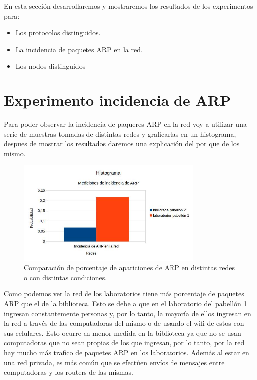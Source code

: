 En esta sección desarrollaremos y mostraremos los resultados de los experimentos para:

\begin{itemize}
\item Los protocolos distinguidos.
\item La incidencia de paquetes ARP en la red.
\item Los nodos distinguidos.
\end{itemize}

\section{Experimento incidencia de ARP}

Para poder observar la incidencia de paqueres ARP en la red voy a utilizar una serie de muestras tomadas de distintas redes y graficarlas en un histograma, despues de mostrar
los resultados daremos una explicación del por que de los mismo.

\begin{figure}[ht!]
\centering
\includegraphics[width=90mm]{imagenes/IncidenciaARP.jpg}
\caption{Comparación de porcentaje de apariciones de ARP en distintas redes o con distintas condiciones.\label{overflow}}
\end{figure}

Como podemos ver la red de los laboratorios tiene más porcentaje de paquetes ARP que el de la biblioteca. Esto se debe a que en el laboratorio del pabellón 1 ingresan 
constantemente personas y, por lo tanto, la mayoría de ellos ingresan en la red a través de las computadoras del mismo o de usando el wifi de estos con sus celulares. Esto 
ocurre en menor medida en la biblioteca ya que no se usan computadoras que no sean propias de los que ingresan, por lo tanto, por la red hay mucho más trafico de paquetes 
ARP en los laboratorios. Además al estar en una red privada, es más común que se efectúen envíos de mensajes entre computadoras y los routers de las mismas.

